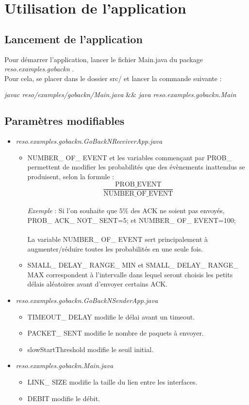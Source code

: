 \documentclass[]{article}
\begin{document}
\section{Utilisation de l'application}
\subsection{Lancement de l'application}
Pour démarrer l'application, lancer le fichier Main.java du package \emph{reso.examples.gobackn}  .\\
Pour cela, se placer dans le dossier src/ et lancer la commande suivante :
\begin{center}
\emph{javac reso/examples/gobackn/Main.java} \&\& \emph{java reso.examples.gobackn.Main}
\end{center}
\subsection{Paramètres modifiables}
\begin{itemize}
\item \emph{reso.examples.gobackn.GoBackNReceiverApp.java}
\begin{itemize}
\item NUMBER\_ OF\_ EVENT et les variables commençant par PROB\_ permettent de modifier les probabilités que des évènements inattendus se produisent, selon la formule : \[\frac{\text{PROB\_ EVENT}}{\text{NUMBER\_ OF\_ EVENT}}\]\\
\emph{Exemple} : Si l'on souhaite que $5\%$ des ACK ne soient pas envoyés,\\ PROB\_ ACK\_ NOT\_ SENT=5; et NUMBER\_ OF\_ EVENT=100;\\\\
La variable NUMBER\_ OF\_ EVENT sert principalement à augmenter/réduire toutes les probabilités en une seule fois.
\item SMALL\_ DELAY\_ RANGE\_ MIN et SMALL\_ DELAY\_ RANGE\_ MAX correspondent à l'intervalle dans lequel seront choisis les petits délais aléatoires avant d'envoyer certains ACK.\\
\end{itemize}
\item \emph{reso.examples.gobackn.GoBackNSenderApp.java}
\begin{itemize}
\item TIMEOUT\_ DELAY modifie le délai avant un timeout.
\item PACKET\_ SENT modifie le nombre de paquets à envoyer.
\item slowStartThreshold modifie le seuil initial.
\end{itemize}
\item \emph{reso.examples.gobackn.Main.java}
\begin{itemize}
\item LINK\_ SIZE modifie la taille du lien entre les interfaces.
\item DEBIT modifie le débit.
\end{itemize}
\end{itemize}
\end{document}
